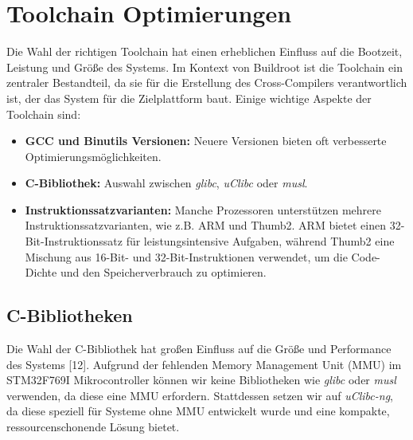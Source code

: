 
\section{Toolchain Optimierungen}
Die Wahl der richtigen Toolchain hat einen erheblichen Einfluss auf die Bootzeit, Leistung und Größe des Systems. Im Kontext von Buildroot ist die Toolchain ein zentraler Bestandteil, da sie für die Erstellung des Cross-Compilers verantwortlich ist, der das System für die Zielplattform baut. Einige wichtige Aspekte der Toolchain sind:

\begin{itemize}
	\item \textbf{GCC und Binutils Versionen:} Neuere Versionen bieten oft verbesserte Optimierungsmöglichkeiten.
	\item \textbf{C-Bibliothek:} Auswahl zwischen \textit{glibc}, \textit{uClibc} oder \textit{musl}.
	\item \textbf{Instruktionssatzvarianten:} Manche Prozessoren unterstützen mehrere Instruktionssatzvarianten, wie z.B. ARM und Thumb2. ARM bietet einen 32-Bit-Instruktionssatz für leistungsintensive Aufgaben, während Thumb2 eine Mischung aus 16-Bit- und 32-Bit-Instruktionen verwendet, um die Code-Dichte und den Speicherverbrauch zu optimieren.
\end{itemize}

\subsection{C-Bibliotheken}
Die Wahl der C-Bibliothek hat großen Einfluss auf die Größe und Performance des Systems [12]. Aufgrund der fehlenden Memory Management Unit (MMU) im STM32F769I Mikrocontroller können wir keine Bibliotheken wie \textit{glibc} oder \textit{musl} verwenden, da diese eine MMU erfordern. Stattdessen setzen wir auf \textit{uClibc-ng}, da diese speziell für Systeme ohne MMU entwickelt wurde und eine kompakte, ressourcenschonende Lösung bietet.
